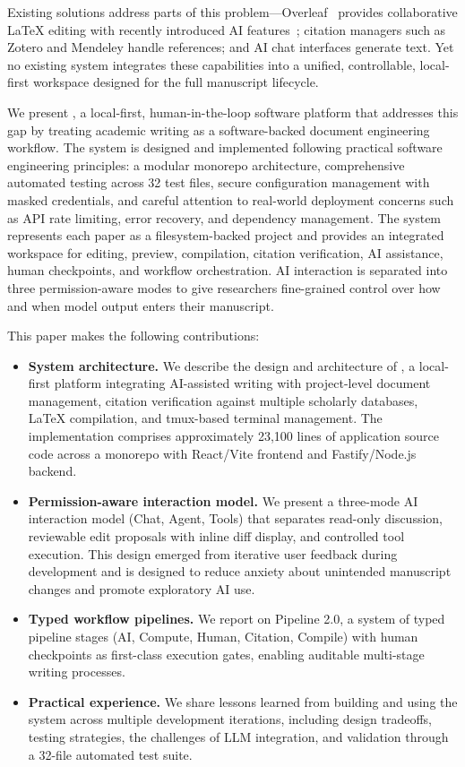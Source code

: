 Existing solutions address parts of this problem---Overleaf~\cite{overleaf}
provides collaborative \LaTeX{} editing with recently introduced AI
features~\cite{overleaf2024ai}; citation managers such as Zotero and Mendeley
handle references; and AI chat interfaces generate text. Yet no existing
system integrates these capabilities into a unified, controllable, local-first
workspace designed for the full manuscript lifecycle.

We present \software{}, a local-first, human-in-the-loop software platform
that addresses this gap by treating academic writing as a software-backed
document engineering workflow. The system is designed and implemented
following practical software engineering principles: a modular monorepo
architecture, comprehensive automated testing across 32 test files, secure
configuration management with masked credentials, and careful attention to
real-world deployment concerns such as API rate limiting, error recovery,
and dependency management. The system represents each paper as a
filesystem-backed project and provides an integrated workspace for editing,
preview, compilation, citation verification, AI assistance, human checkpoints,
and workflow orchestration. AI interaction is separated into three
permission-aware modes to give researchers fine-grained control over how and
when model output enters their manuscript.

This paper makes the following contributions:

\begin{itemize}
  \item \textbf{System architecture.} We describe the design and architecture
  of \software{}, a local-first platform integrating AI-assisted writing with
  project-level document management, citation verification against multiple
  scholarly databases, \LaTeX{} compilation, and tmux-based terminal
  management. The implementation comprises approximately 23,100 lines of application
  source code across a monorepo with React/Vite frontend and Fastify/Node.js backend.

  \item \textbf{Permission-aware interaction model.} We present a
  three-mode AI interaction model (Chat, Agent, Tools) that separates read-only
  discussion, reviewable edit proposals with inline diff display, and
  controlled tool execution. This design emerged from iterative user feedback
  during development and is designed to reduce anxiety about unintended
  manuscript changes and promote exploratory AI use.

  \item \textbf{Typed workflow pipelines.} We report on Pipeline 2.0, a
  system of typed pipeline stages (AI, Compute, Human, Citation, Compile) with
  human checkpoints as first-class execution gates, enabling auditable
  multi-stage writing processes.

  \item \textbf{Practical experience.} We share lessons learned from building
  and using the system across multiple development iterations,
  including design tradeoffs, testing strategies, the challenges of LLM
  integration, and validation through a 32-file automated test suite.
\end{itemize}

